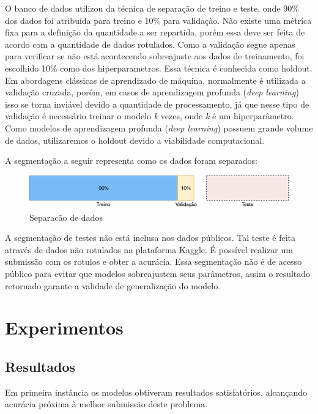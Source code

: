 \documentclass[12pt]{article}
\begin{document}
O banco de dados utilizou da técnica de separação de treino e teste, onde 90\% dos dados foi atribuída para treino e 10\% para validação. Não existe uma métrica fixa para a definição da quantidade a ser repartida, porém essa deve ser feita de acordo com a quantidade de dados rotulados. Como a validação segue apenas para verificar se não está acontecendo sobreajuste aos dados de treinamento, foi escolhido 10\% como dos hiperparametros. Essa técnica é conhecida como holdout. Em abordagens clássicas de aprendizado de máquina, normalmente é utilizada a validação cruzada, porém, em casos de aprendizagem profunda (\textit{deep learning}) isso se torna inviável devido a quantidade de processamento, já que nesse tipo de validação é necessário treinar o modelo \textit{k} vezes, onde \textit{k} é um hiperparâmetro. Como modelos de aprendizagem profunda (\textit{deep learning}) possuem grande volume de dados, utilizaremos o holdout devido a viabilidade computacional.

A segmentação a seguir representa como os dados foram separados:

\begin{figure}[!htb]
\centering
\includegraphics[width=1\textwidth]{images/datasplit.png}
\caption{Separacão de dados}
\label{fig:datasplit}
\end{figure}

A segmentação de testes não está inclusa nos dados públicos. Tal teste é feita através de dados não rotulados na plataforma Kaggle. É possível realizar um submissão com os rotulos e obter a acurácia. Essa segmentação não é de acesso público para evitar que modelos sobreajustem seus parâmetros, assim o resultado retornado garante a validade de generalização do modelo.

\section{Experimentos}

\subsection{Resultados}

Em primeira instância os modelos obtiveram resultados satisfatórios, alcançando acurácia próxima à melhor submissão deste problema.
\end{document}
